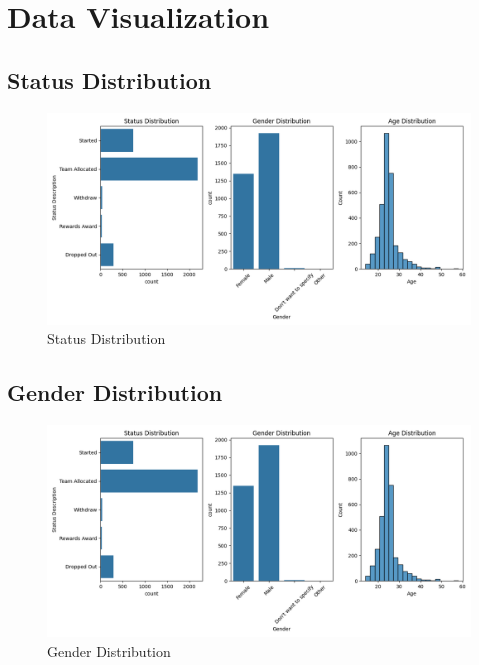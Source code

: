\documentclass{article}
\begin{document}
\section{Data Visualization}

\subsection{Status Distribution}
\begin{figure}[H]
    \centering
    \includegraphics[width=\textwidth]{../Statistics/Figure_1.png}
    \caption{Status Distribution}
\end{figure}

\subsection{Gender Distribution}
\begin{figure}[H]
    \centering
    \includegraphics[width=\textwidth]{../Statistics/Figure_1.png}
    \caption{Gender Distribution}
\end{figure}
\end{document}
